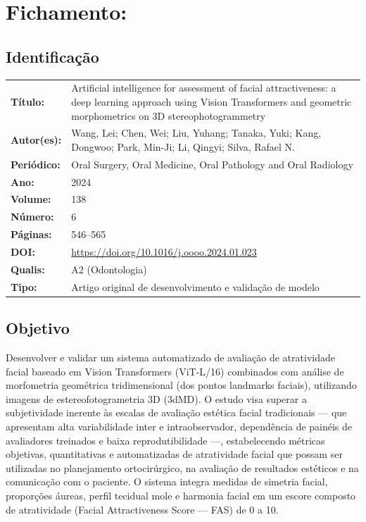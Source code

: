 \section{Fichamento: }

\subsection{Identificação}
\begin{tabular}{ll}
\textbf{Título:} & Artificial intelligence for assessment of facial
attractiveness: a deep learning approach using Vision Transformers
and geometric morphometrics on 3D stereophotogrammetry \\
\textbf{Autor(es):} & Wang, Lei; Chen, Wei; Liu, Yuhang; Tanaka, Yuki;
Kang, Dongwoo; Park, Min-Ji; Li, Qingyi; Silva, Rafael N. \\
\textbf{Periódico:} & Oral Surgery, Oral Medicine, Oral Pathology and Oral Radiology \\
\textbf{Ano:} & 2024 \\
\textbf{Volume:} & 138 \\
\textbf{Número:} & 6 \\
\textbf{Páginas:} & 546--565 \\
\textbf{DOI:} & \url{https://doi.org/10.1016/j.oooo.2024.01.023} \\
\textbf{Qualis:} & A2 (Odontologia) \\
\textbf{Tipo:} & Artigo original de desenvolvimento e validação de modelo \\
\end{tabular}

\subsection{Objetivo}
Desenvolver e validar um sistema automatizado de avaliação de
atratividade facial baseado em Vision Transformers (ViT-L/16)
combinados com análise de morfometria geométrica tridimensional
(dos pontos landmarks faciais), utilizando imagens de
estereofotogrametria 3D (3dMD). O estudo visa superar a
subjetividade inerente às escalas de avaliação estética facial
tradicionais --- que apresentam alta variabilidade inter e
intraobservador, dependência de painéis de avaliadores treinados
e baixa reprodutibilidade ---, estabelecendo métricas objetivas,
quantitativas e automatizadas de atratividade facial que possam
ser utilizadas no planejamento ortocirúrgico, na avaliação de
resultados estéticos e na comunicação com o paciente. O sistema
integra medidas de simetria facial, proporções áureas, perfil
tecidual mole e harmonia facial em um escore composto de
atratividade (Facial Attractiveness Score --- FAS) de 0 a 10.

